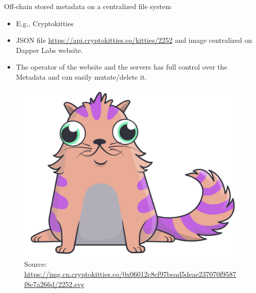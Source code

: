 \documentclass[handout]{beamer}
\begin{document}
\begin{frame}{Off-chain stored metadata on a centralized file system}
\begin{itemize}
	\item E.g., Cryptokitties
	\item JSON file \link \href{https://api.cryptokitties.co/kitties/2252}{https://api.cryptokitties.co/kitties/2252} and image centralized on Dapper Labs website.
	\item The operator of the website and the servers has full control over the Metadata and can easily mutate/delete it.
\end{itemize}
\vspace{1em}
\begin{figure}
	\centering
	\includegraphics[scale=0.2]{../assets/images/cryptokitty.png}
	\caption*{Source: \link \href{https://img.cn.cryptokitties.co/0x06012c8cf97bead5deae237070f9587f8e7a266d/2252.svg} {\tiny https://img.cn.cryptokitties.co/0x06012c8cf97bead5deae237070f9587f8e7a266d/2252.svg}	}
\end{figure}
\end{frame}


%	
%	
\end{document}
